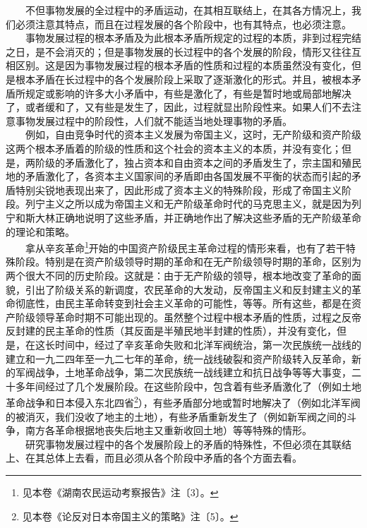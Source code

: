 \documentclass[cn,11pt,chinese]{elegantbook}
\begin{document}
　　不但事物发展的全过程中的矛盾运动，在其相互联结上，在其各方情况上，我们必须注意其特点，而且在过程发展的各个阶段中，也有其特点，也必须注意。\\
　　事物发展过程的根本矛盾及为此根本矛盾所规定的过程的本质，非到过程完结之日，是不会消灭的；但是事物发展的长过程中的各个发展的阶段，情形又往往互相区别。这是因为事物发展过程的根本矛盾的性质和过程的本质虽然没有变化，但是根本矛盾在长过程中的各个发展阶段上采取了逐渐激化的形式。并且，被根本矛盾所规定或影响的许多大小矛盾中，有些是激化了，有些是暂时地或局部地解决了，或者缓和了，又有些是发生了，因此，过程就显出阶段性来。如果人们不去注意事物发展过程中的阶段性，人们就不能适当地处理事物的矛盾。\\
　　例如，自由竞争时代的资本主义发展为帝国主义，这时，无产阶级和资产阶级这两个根本矛盾着的阶级的性质和这个社会的资本主义的本质，并没有变化；但是，两阶级的矛盾激化了，独占资本和自由资本之间的矛盾发生了，宗主国和殖民地的矛盾激化了，各资本主义国家间的矛盾即由各国发展不平衡的状态而引起的矛盾特别尖锐地表现出来了，因此形成了资本主义的特殊阶段，形成了帝国主义阶段。列宁主义之所以成为帝国主义和无产阶级革命时代的马克思主义，就是因为列宁和斯大林正确地说明了这些矛盾，并正确地作出了解决这些矛盾的无产阶级革命的理论和策略。\\
　　拿从辛亥革命\footnote[17]{ 见本卷《湖南农民运动考察报告》注〔3〕。}开始的中国资产阶级民主革命过程的情形来看，也有了若干特殊阶段。特别是在资产阶级领导时期的革命和在无产阶级领导时期的革命，区别为两个很大不同的历史阶段。这就是：由于无产阶级的领导，根本地改变了革命的面貌，引出了阶级关系的新调度，农民革命的大发动，反帝国主义和反封建主义的革命彻底性，由民主革命转变到社会主义革命的可能性，等等。所有这些，都是在资产阶级领导革命时期不可能出现的。虽然整个过程中根本矛盾的性质，过程之反帝反封建的民主革命的性质（其反面是半殖民地半封建的性质），并没有变化，但是，在这长时间中，经过了辛亥革命失败和北洋军阀统治，第一次民族统一战线的建立和一九二四年至一九二七年的革命，统一战线破裂和资产阶级转入反革命，新的军阀战争，土地革命战争，第二次民族统一战线建立和抗日战争等等大事变，二十多年间经过了几个发展阶段。在这些阶段中，包含着有些矛盾激化了（例如土地革命战争和日本侵入东北四省\footnote[18]{ 见本卷《论反对日本帝国主义的策略》注〔5〕。}），有些矛盾部分地或暂时地解决了（例如北洋军阀的被消灭，我们没收了地主的土地），有些矛盾重新发生了（例如新军阀之间的斗争，南方各革命根据地丧失后地主又重新收回土地）等等特殊的情形。\\
　　研究事物发展过程中的各个发展阶段上的矛盾的特殊性，不但必须在其联结上、在其总体上去看，而且必须从各个阶段中矛盾的各个方面去看。\\
\end{document}
